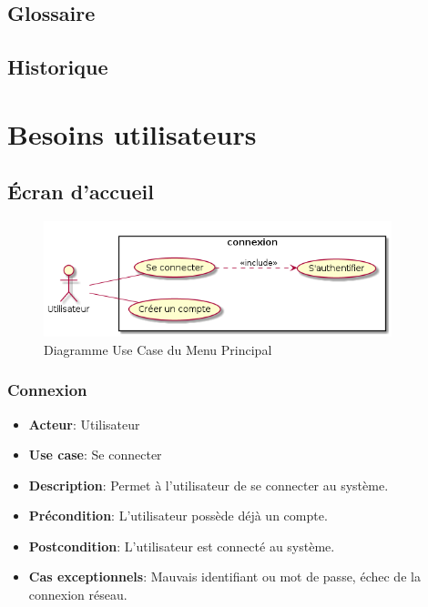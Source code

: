 \documentclass{article}
\begin{document}
\subsection{Glossaire}

\subsection{Historique}

\section{Besoins utilisateurs}

\subsection{Écran d'accueil}

\begin{figure}
    \centering
    	\includegraphics[width=0.9\textwidth]{./uml/usescase/connexion/connexion.png}
    	\caption{Diagramme Use Case du Menu Principal}
    	\label{fig:main-menu}
\end{figure}

\subsubsection*{Connexion}
\begin{itemize}
    \item \textbf{Acteur}: Utilisateur
    \item \textbf{Use case}: Se connecter
    \item \textbf{Description}: Permet à l'utilisateur de se connecter au système.
    \item \textbf{Précondition}: L'utilisateur possède déjà un compte.
    \item \textbf{Postcondition}: L'utilisateur est connecté au système.
    \item \textbf{Cas exceptionnels}: Mauvais identifiant ou mot de passe, échec de la connexion réseau.
\end{itemize}
\end{document}

